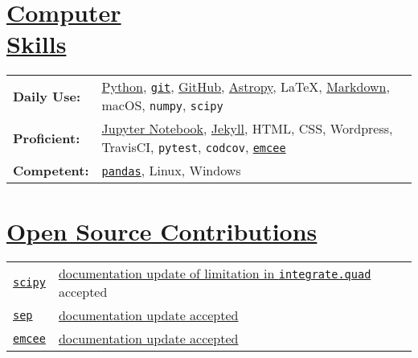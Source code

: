 \documentclass[margin]{res}
\begin{document}
\begin{resume}
\section{\href{https://github.com/benjaminrose}{Computer \\Skills}}
 \hspace{-1em}
 \begin{tabular}{l p{4.5in}}
{\bf Daily Use:} & \href{https://www.python.org}{Python}, \href{https://git-scm.com}{\texttt{git}}, \href{https://github.com/benjaminrose}{GitHub}, \href{http://www.astropy.org}{Astropy}, \LaTeX, \href{http://daringfireball.net/projects/markdown/}{Markdown}, macOS, \texttt{numpy}, \texttt{scipy}\\
{\bf Proficient:} &  \href{http://jupyter.org}{Jupyter Notebook}, \href{https://jekyllrb.com}{Jekyll}, HTML, CSS, Wordpress, TravisCI, \texttt{pytest}, \texttt{codcov}, \href{http://dan.iel.fm/emcee/current/}{\texttt{emcee}}\\
{\bf Competent:} & \href{http://pandas.pydata.org}{\texttt{pandas}}, Linux, Windows %
\end{tabular}









\section{\href{https://github.com/benjaminrose}{Open Source Contributions}}
\hspace{-1em}
\begin{tabular}{l p{4.9in}}
\href{https://www.scipy.org}{\texttt{scipy}} & \href{https://github.com/scipy/scipy/pull/8011}{documentation update of limitation in \texttt{integrate.quad}} accepted\\

\href{http://sep.readthedocs.io/en/v1.0.x/}{\texttt{sep}} & \href{https://github.com/kbarbary/sep/commit/612033788bcce44f110a87e1b54bb70eea9960c2}{documentation update accepted} \\

\href{http://dan.iel.fm/emcee/current/}{\texttt{emcee}} & \href{https://github.com/dfm/emcee/pull/212}{documentation update accepted} \\


\end{tabular}
\end{resume}
\end{document}
